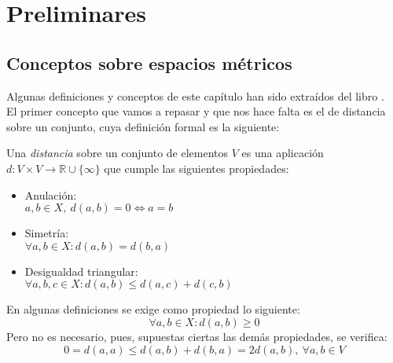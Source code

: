 
\chapter{Preliminares}\label{ch:primer-capitulo}

\section{Conceptos sobre espacios métricos}
Algunas definiciones y conceptos de este capítulo han sido extraídos del libro \cite{topo}. \\

El primer concepto que vamos a repasar y que nos hace falta es el de distancia sobre un conjunto, cuya definición formal es la siguiente:

\begin{definicion}
	Una \textit{distancia} sobre un conjunto de elementos $V$ es una aplicación $d:V\times V\rightarrow \mathbb{R}\cup \{\infty\}$ que cumple las siguientes propiedades:
	\begin{itemize}
		\item Anulación:
		\\ \hspace*{1cm}$a,b \in X,\ d(a,b)=0\Leftrightarrow a=b$
		\item Simetría:
		\\ \hspace*{1cm}$\forall a,b \in X: d(a,b)=d(b,a)$
		\item Desigualdad triangular:
		\\ \hspace*{1cm}$\forall a,b,c \in X: d(a,b)\leq d(a,c)+d(c,b)$
	\end{itemize}
\end{definicion}

En algunas definiciones se exige como propiedad lo siguiente:
$$\forall a,b\in X:d(a,b) \geq 0$$
Pero no es necesario, pues, supuestas ciertas las demás propiedades, se verifica:
$$0=d(a,a)\leq d(a,b) + d(b,a) = 2d(a,b),\ \forall a,b\in V$$

